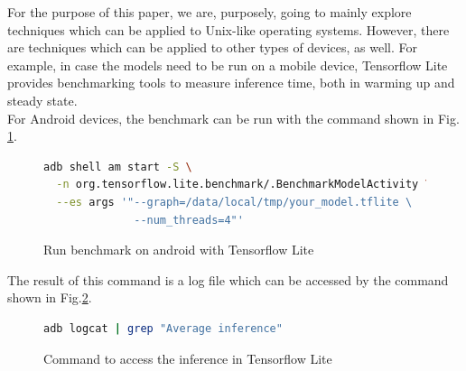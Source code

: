 For the purpose of this paper, we are, purposely, going to mainly explore techniques which can be applied to Unix-like operating systems. However, there are techniques which can be applied to other types of devices, as well. For example, in case the models need to be run on a mobile device, Tensorflow Lite provides benchmarking tools to measure inference time, both in warming up and steady state. \cite{tensorflow2015-whitepaper}\\ 
For Android devices, the benchmark can be run with the command shown in Fig. \ref{fig:bench_ten_lite_an}.\\
\begin{figure}[h]
\begin{lstlisting}[language=bash]
adb shell am start -S \
  -n org.tensorflow.lite.benchmark/.BenchmarkModelActivity \
  --es args '"--graph=/data/local/tmp/your_model.tflite \
              --num_threads=4"'
\end{lstlisting}
\caption[Run benchmark on android with Tensorflow Lite]{Run benchmark on android with Tensorflow Lite \cite{tensorflow2015-whitepaper}}
\label{fig:bench_ten_lite_an}
\end{figure}
The result of this command is a log file which can be accessed by the command shown in Fig.\ref{fig:inf_ten}.\\
\begin{figure}[h]
\begin{lstlisting}[language=bash]
adb logcat | grep "Average inference"
\end{lstlisting}
\caption[Command to access the inference in Tensorflow Lite]{Command to access the inference in Tensorflow Lite\cite{tensorflow2015-whitepaper}}
\label{fig:inf_ten}
\end{figure}



